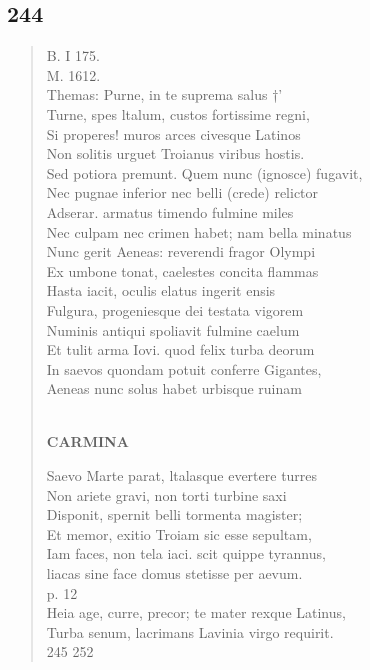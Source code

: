 \documentclass[11pt, a4paper]{report}
\begin{document}
            \subsection*{244}
      \begin{verse}
      B. I 175. \\ M. 1612. \\ Themas: Purne, in te suprema salus †’ \\ Turne, spes ltalum, custos fortissime regni, \\ Si properes! muros arces civesque Latinos \\ Non solitis urguet Troianus viribus hostis. \\ Sed potiora premunt. Quem nunc (ignosce) fugavit, \\ Nec pugnae inferior nec belli (crede) relictor \\ Adserar. armatus timendo fulmine miles \\ Nec culpam nec crimen habet; nam bella minatus \\ Nunc gerit Aeneas: reverendi fragor Olympi \\ Ex umbone tonat, caelestes concita flammas \\ Hasta iacit, oculis elatus ingerit ensis \\ Fulgura, progeniesque dei testata vigorem \\ Numinis antiqui spoliavit fulmine caelum \\ Et tulit arma Iovi. quod felix turba deorum \\ In saevos quondam potuit conferre Gigantes, \\ Aeneas nunc solus habet urbisque ruinam \\ 
        ﻿\pagebreak 
    \begin{center} \textbf{CARMINA} \end{center} \marginpar{[200]} Saevo Marte parat, ltalasque evertere turres \\ Non ariete gravi, non torti turbine saxi \\ Disponit, spernit belli tormenta magister; \\ Et memor, exitio Troiam sic esse sepultam, \\ Iam faces, non tela iaci. scit quippe tyrannus, \\ liacas sine face domus stetisse per aevum. \\ p. 12 \\ Heia age, curre, precor; te mater rexque Latinus, \\ Turba senum, lacrimans Lavinia virgo requirit. \\ 245 252 \\ 
      \end{verse}
  
\end{document}
